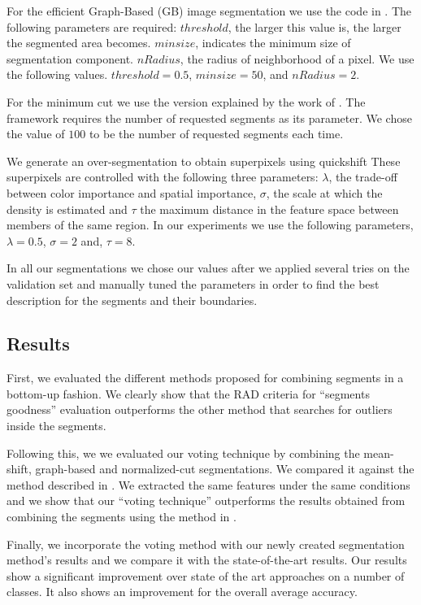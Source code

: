 \documentclass[10pt,twocolumn,letterpaper]{article}
\begin{document}
For the efficient Graph-Based (GB) image segmentation we use the code in
\cite{Felzenszwalb04efficientgraph-based}.
The following parameters are required: $threshold$, the larger this value is, the larger the segmented area becomes.
$minsize$, indicates the minimum size of segmentation component.
$nRadius$, the radius of neighborhood of a pixel.
We use the following values. $threshold = 0.5$, $minsize = 50$, and $nRadius = 2$.

For the minimum cut we use the version explained by the work of \cite{1069213}.
The framework requires the number of requested segments as its parameter.
We chose the value of $100$ to be the number of requested segments each time.

We generate an over-segmentation to obtain superpixels using quickshift \cite{vedaldi08quick}
These superpixels are controlled with the following three parameters:
$\lambda$, the trade-off between color importance and spatial importance,
$\sigma$, the scale at which the density is estimated
and $\tau$ the maximum distance in the feature space between members of the same region.
In our experiments we use the following parameters, $\lambda = 0.5$, $\sigma = 2$ and, $\tau = 8$.

In all our segmentations we chose our values after we applied several tries on the validation set and manually tuned the
parameters in order to find the best description for the segments and their boundaries.

\subsection{Results}

First, we evaluated the different methods proposed for combining segments in a bottom-up fashion.
We clearly show that the RAD criteria for ``segments goodness'' evaluation outperforms the other method
that searches for outliers inside the segments.

Following this, we we evaluated our voting technique by combining the mean-shift, graph-based and normalized-cut
segmentations. We compared it against the method described in \cite{PSH08}. We extracted the same features under
the same conditions and we show that our ``voting technique'' outperforms the results obtained from combining
the segments using the method in \cite{PSH08}.

Finally, we incorporate the voting method with our newly created segmentation method's results and we compare it
with the state-of-the-art results. Our results show a significant improvement over state of the art approaches on a
number of classes. It also shows an improvement for the overall average accuracy.
\end{document}
